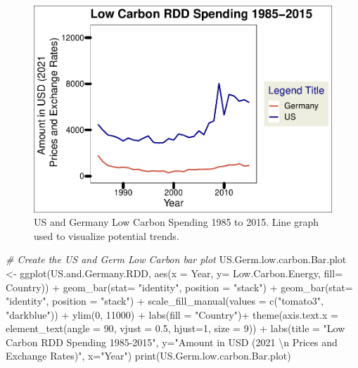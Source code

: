 \documentclass[
  12pt,
]{article}
\newenvironment{Shaded}{\begin{snugshade}}{\end{snugshade}}
\newcommand{\AttributeTok}[1]{\textcolor[rgb]{0.77,0.63,0.00}{#1}}
\newcommand{\CommentTok}[1]{\textcolor[rgb]{0.56,0.35,0.01}{\textit{#1}}}
\newcommand{\DecValTok}[1]{\textcolor[rgb]{0.00,0.00,0.81}{#1}}
\newcommand{\FloatTok}[1]{\textcolor[rgb]{0.00,0.00,0.81}{#1}}
\newcommand{\FunctionTok}[1]{\textcolor[rgb]{0.00,0.00,0.00}{#1}}
\newcommand{\NormalTok}[1]{#1}
\newcommand{\OtherTok}[1]{\textcolor[rgb]{0.56,0.35,0.01}{#1}}
\newcommand{\SpecialCharTok}[1]{\textcolor[rgb]{0.00,0.00,0.00}{#1}}
\newcommand{\StringTok}[1]{\textcolor[rgb]{0.31,0.60,0.02}{#1}}
\begin{document}
\begin{figure}
\centering
\includegraphics{Chang_Jenkins_Mullens_ENV872_Final_files/figure-latex/Low Carbon Germ and US Line Plot-1.pdf}
\caption{US and Germany Low Carbon Spending 1985 to 2015. Line graph
used to visualize potential trends.}
\end{figure}

\begin{Shaded}
\begin{Highlighting}[]
\CommentTok{\# Create the US and Germ Low Carbon bar plot}
\NormalTok{US.Germ.low.carbon.Bar.plot }\OtherTok{\textless{}{-}} \FunctionTok{ggplot}\NormalTok{(US.and.Germany.RDD, }\FunctionTok{aes}\NormalTok{(}\AttributeTok{x =}\NormalTok{ Year, }\AttributeTok{y=}\NormalTok{ Low.Carbon.Energy, }\AttributeTok{fill=}\NormalTok{ Country)) }\SpecialCharTok{+}
  \FunctionTok{geom\_bar}\NormalTok{(}\AttributeTok{stat=} \StringTok{"identity"}\NormalTok{, }\AttributeTok{position =} \StringTok{"stack"}\NormalTok{) }\SpecialCharTok{+}
  \FunctionTok{geom\_bar}\NormalTok{(}\AttributeTok{stat=} \StringTok{"identity"}\NormalTok{, }\AttributeTok{position =} \StringTok{"stack"}\NormalTok{) }\SpecialCharTok{+}
  \FunctionTok{scale\_fill\_manual}\NormalTok{(}\AttributeTok{values =} \FunctionTok{c}\NormalTok{(}\StringTok{"tomato3"}\NormalTok{, }\StringTok{"darkblue"}\NormalTok{)) }\SpecialCharTok{+}
  \FunctionTok{ylim}\NormalTok{(}\DecValTok{0}\NormalTok{, }\DecValTok{11000}\NormalTok{) }\SpecialCharTok{+}
  \FunctionTok{labs}\NormalTok{(}\AttributeTok{fill =} \StringTok{"Country"}\NormalTok{)}\SpecialCharTok{+}
  \FunctionTok{theme}\NormalTok{(}\AttributeTok{axis.text.x =} \FunctionTok{element\_text}\NormalTok{(}\AttributeTok{angle =} \DecValTok{90}\NormalTok{, }\AttributeTok{vjust =} \FloatTok{0.5}\NormalTok{, }\AttributeTok{hjust=}\DecValTok{1}\NormalTok{, }\AttributeTok{size =} \DecValTok{9}\NormalTok{)) }\SpecialCharTok{+}
  \FunctionTok{labs}\NormalTok{(}\AttributeTok{title =} \StringTok{"Low Carbon RDD Spending 1985{-}2015"}\NormalTok{,}
       \AttributeTok{y=}\StringTok{"Amount in USD (2021 }\SpecialCharTok{\textbackslash{}n}\StringTok{ Prices and Exchange Rates)"}\NormalTok{,}
       \AttributeTok{x=}\StringTok{"Year"}\NormalTok{)}
\FunctionTok{print}\NormalTok{(US.Germ.low.carbon.Bar.plot)}
\end{Highlighting}
\end{Shaded}
\end{document}
